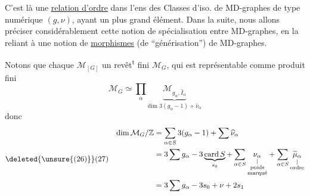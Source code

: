 C'est là une \uline{relation d'ordre} dans l'ens des Classes d'iso. de MD-graphes de type numérique $(g,\nu)$, ayant un plus grand élément. Dans la suite, nous allons préciser considérablement cette notion de spécialisation entre MD-graphes, en la reliant à une notion de \uline{morphismes} (de ``générisation'') de MD-graphes.

Notons que chaque $\mathcal M_{[G]}$  un revêt\textsuperscript{t} fini $\mathcal M_G$, qui est représentable comme produit fini
\[
\mathcal M_G\simeq\prod_\alpha\underbrace{\mathcal M_{g_\alpha,\widehat I_\alpha}}_{\text{dim }3(g_\alpha-1)+\widehat\nu_\alpha}
\]
donc
\[
\deleted{\unsure{(26)}}(27)\quad\begin{aligned}
\dim\mathcal M_G/\mathbb Z&=\sum_{\alpha\in S}3(g_\alpha-1)+\sum\widehat\nu_\alpha\\
&=3\sum g_\alpha-3\underbrace{\operatorname{card}S}_{s_0}+\sum_{\alpha\in S}\underset{\substack{|\\\text{poids}\\\text{marqué}}}{\nu_\alpha}+\sum_{\alpha\in S}\underset{\substack{|\\\text{ordre}}}{\widetilde\mu_\alpha}\\
&=3\sum g_\alpha-3s_0+\nu+2s_1
\end{aligned}
\]
